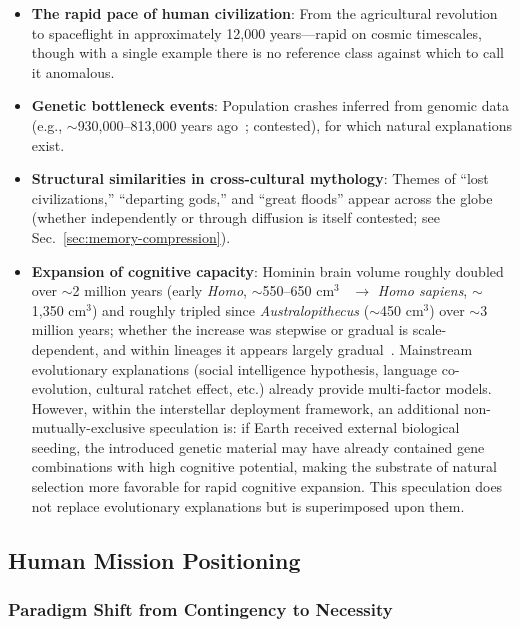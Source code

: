 \documentclass[aps,prd,twocolumn,superscriptaddress,nofootinbib]{revtex4-2}
\begin{document}
\begin{itemize}
  \item \textbf{The rapid pace of human civilization}: From the agricultural revolution to spaceflight in approximately 12,000 years---rapid on cosmic timescales, though with a single example there is no reference class against which to call it anomalous.
  \item \textbf{Genetic bottleneck events}: Population crashes inferred from genomic data (e.g., ${\sim}$930,000--813,000 years ago~\cite{Hu2023}; contested), for which natural explanations exist.
  \item \textbf{Structural similarities in cross-cultural mythology}: Themes of ``lost civilizations,'' ``departing gods,'' and ``great floods'' appear across the globe (whether independently or through diffusion is itself contested; see Sec.~\ref{sec:memory-compression}).
  \item \textbf{Expansion of cognitive capacity}: Hominin brain volume roughly doubled over ${\sim}$2 million years (early \textit{Homo}, ${\sim}$550--650 cm$^{3}$~\cite{Rightmire2004} $\to$ \textit{Homo sapiens}, ${\sim}$1,350 cm$^{3}$) and roughly tripled since \textit{Australopithecus} (${\sim}$450 cm$^{3}$) over ${\sim}$3 million years; whether the increase was stepwise or gradual is scale-dependent, and within lineages it appears largely gradual~\cite{Du2018}. Mainstream evolutionary explanations (social intelligence hypothesis, language co-evolution, cultural ratchet effect, etc.) already provide multi-factor models. However, within the interstellar deployment framework, an additional non-mutually-exclusive speculation is: if Earth received external biological seeding, the introduced genetic material may have already contained gene combinations with high cognitive potential, making the substrate of natural selection more favorable for rapid cognitive expansion. This speculation does not replace evolutionary explanations but is superimposed upon them.
\end{itemize}

\subsection{Human Mission Positioning}\label{sec:human-mission}

\subsubsection{Paradigm Shift from Contingency to Necessity}\label{sec:paradigm-shift}
\end{document}

